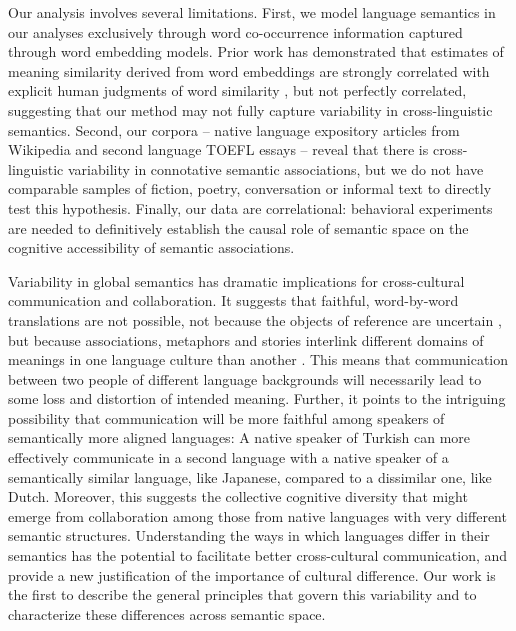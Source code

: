 \documentclass[9pt,twocolumn,twoside,lineno]{pnas-new}
\begin{document}
Our analysis involves several limitations. First, we model language semantics in our analyses exclusively through word co-occurrence information captured through word embedding models. Prior work has demonstrated that estimates of meaning similarity derived from word embeddings are strongly correlated with explicit human judgments of word similarity \cite{hill2015simlex}, but not perfectly correlated, suggesting that our method may not fully capture variability in cross-linguistic semantics. Second, our corpora -- native language expository articles from Wikipedia and second language TOEFL essays -- reveal that there is cross-linguistic variability in connotative semantic associations, but we do not have comparable samples of fiction, poetry, conversation or informal text to directly test this hypothesis. Finally, our data are correlational: behavioral experiments are needed to definitively establish the causal role of semantic space on the cognitive accessibility of semantic associations. %


Variability in global semantics has dramatic implications for cross-cultural communication and collaboration. It suggests that faithful, word-by-word translations are not possible, not because the objects of reference are uncertain \cite{quine2013word}, but because associations, metaphors and stories interlink different domains of meanings in one language culture than another \cite{lakoff1987categories}. This means that communication between two people of different language backgrounds will necessarily lead to some loss and distortion of intended meaning. Further, it points to the intriguing possibility that communication will be more faithful among speakers of semantically more aligned languages: A native speaker of Turkish can more effectively communicate in a second language with a native speaker of a semantically similar language, like Japanese, compared to a dissimilar one, like Dutch. Moreover, this suggests the collective cognitive diversity that might emerge from collaboration among those from native languages with very different semantic structures. Understanding the ways in which languages differ in their semantics has the potential to facilitate better cross-cultural communication, and provide a new justification of the importance of cultural difference. Our work is the first to describe the general principles that govern this variability and to characterize these differences across semantic space. 
\end{document}

